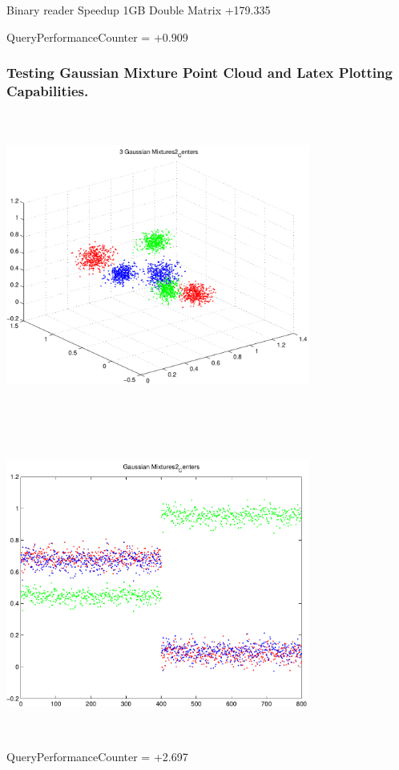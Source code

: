 \documentclass[9pt]{article}
\theoremstyle{plain}
\theoremstyle{definition}
\theoremstyle{remark}
\numberwithin{equation}{section}
\begin{document}
Binary reader Speedup 1GB Double Matrix +179.335

QueryPerformanceCounter  =  +0.909
\subsubsection{Testing Gaussian Mixture Point Cloud and Latex Plotting Capabilities.}
\includegraphics[width=10.0cm,height=10.0cm]{GaussianMixture_Dim_3_Centers2.pdf}

\includegraphics[width=10.0cm,height=10.0cm]{GaussianMixture_Dim_1_Centers2.pdf}

QueryPerformanceCounter  =  +2.697
\end{document}

